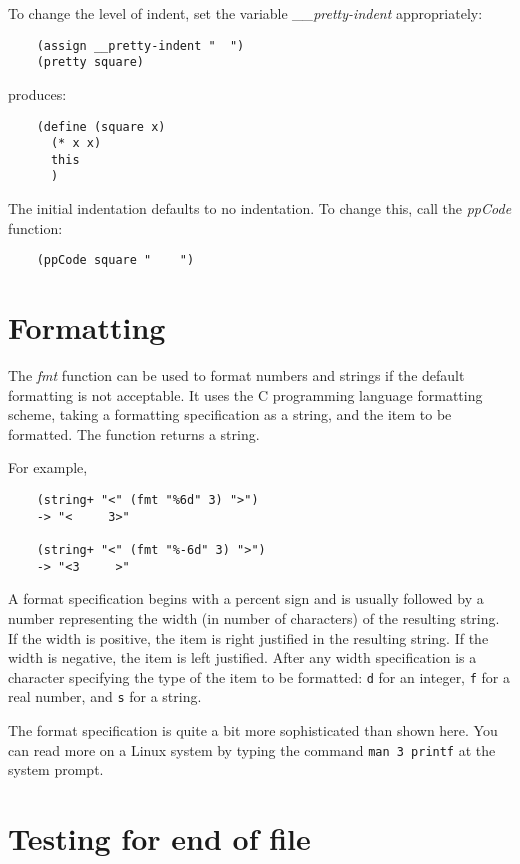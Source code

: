 To change the level of indent, set the variable {\it \_\_pretty-indent} 
appropriately:

\begin{verbatim}
    (assign __pretty-indent "  ")
    (pretty square)
\end{verbatim}

produces:

\begin{verbatim}
    (define (square x)
      (* x x)
      this
      )
\end{verbatim}

The initial indentation defaults to no indentation.
To change this, call the {\it ppCode} function:

\begin{verbatim}
    (ppCode square "    ")
\end{verbatim}

\section{Formatting}

The {\it fmt} function can be used to format numbers and strings
if the default formatting is not acceptable. It uses the C
programming language formatting scheme, taking a formatting
specification as a string, and the item to be formatted.
The function returns a string.

For example,

\begin{verbatim}
    (string+ "<" (fmt "%6d" 3) ">")
    -> "<     3>"

    (string+ "<" (fmt "%-6d" 3) ">")
    -> "<3     >"
\end{verbatim}

A format specification begins with a percent sign and is usually followed
by a number representing the width (in number of characters)
of the resulting string. If the width is positive, the
item is right justified in the resulting string. If the width
is negative, the item is left justified.
After any width specification is a character specifying the
type of the item to be formatted:
\verb!d! for an integer,
\verb!f! for a real number, and
\verb!s! for a string.

The format specification is quite a bit more sophisticated
than shown here. You can read more on a Linux system by
typing the command \verb!man 3 printf! at the system prompt.

\section{Testing for end of file}


